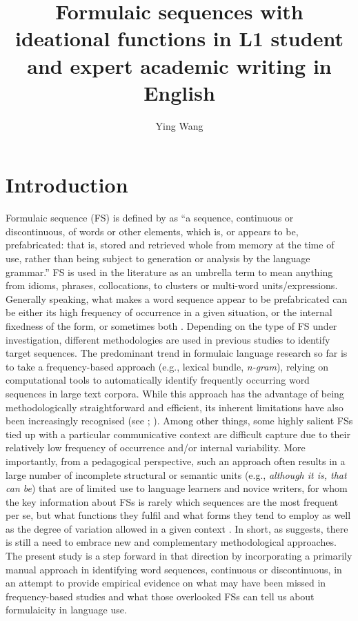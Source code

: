 \documentclass[output=paper]{langscibook}
\author{Ying Wang\affiliation{Karlstad University}}
\title[Formulaic sequences in L1 student and expert academic writing in English]{Formulaic sequences with ideational functions in L1 student and expert academic writing in English}
\begin{document}
\maketitle 


\section{Introduction}

Formulaic sequence (FS) is defined by \citet[9]{Wray2002} as “a sequence, continuous or discontinuous, of words or other elements, which is, or appears to be, prefabricated: that is, stored and retrieved whole from memory at the time of use, rather than being subject to generation or analysis by the language grammar.” FS is used in the literature as an umbrella term to mean anything from idioms, phrases, collocations, to clusters or multi-word units/expressions. Generally speaking, what makes a word sequence appear to be prefabricated can be either its high frequency of occurrence in a given situation, or the internal fixedness of the form, or sometimes both \citep{Siyanova-Chanturia2013}. Depending on the type of FS under investigation, different methodologies are used in previous studies to identify target sequences. The predominant trend in formulaic language research so far is to take a frequency-based approach (e.g., lexical bundle, \textit{n-gram}), relying on computational tools to automatically identify frequently occurring word sequences in large text corpora. While this approach has the advantage of being methodologically straightforward and efficient, its inherent limitations have also been increasingly recognised (see \citealt{ÄdelErman2012}; \citealt{Wang2018}). Among other things, some highly salient FSs tied up with a particular communicative context are difficult capture due to their relatively low frequency of occurrence and/or internal variability. More importantly, from a pedagogical perspective, such an approach often results in a large number of incomplete structural or semantic units (e.g., \textit{although it is, that can be}) that are of limited use to language learners and novice writers, for whom the key information about FSs is rarely which sequences are the most frequent per se, but what functions they fulfil and what forms they tend to employ as well as the degree of variation allowed in a given context \citep{DurrantMathews-Aydınlı2011}. In short, as \citet{Biber2009} suggests, there is still a need to embrace new and complementary methodological approaches. The present study is a step forward in that direction by incorporating a primarily manual approach in identifying word sequences, continuous or discontinuous, in an attempt to provide empirical evidence on what may have been missed in frequency-based studies and what those overlooked FSs can tell us about formulaicity in language use. 
\end{document}
